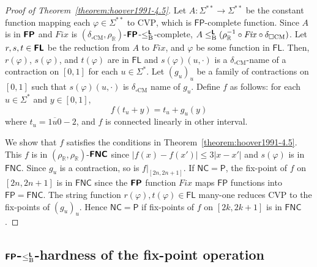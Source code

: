 \documentclass[envcountsect,envcountsame,orivec,oribibl]{llncs}
\newcommand{\R}{\mathbb R}
\newcommand{\classonefont}[1]{\mathsf{#1}}
\newcommand{\classFL}{\classonefont{FL}}
\newcommand{\classP}{\classonefont{P}}
\newcommand{\classFP}{\classonefont{FP}}
\newcommand{\classNC}{\classonefont{NC}}
\newcommand{\classFNC}{\classonefont{FNC}}
\newcommand{\classtwofont}[1]{\text{\bfseries \sffamily \upshape #1}}
\newcommand{\classLtwo}{\classtwofont{L}}
\newcommand{\classFLtwo}{\classtwofont{FL}}
\newcommand{\classFNCtwo}{\classtwofont{FNC}}
\newcommand{\classFPtwo}{\classtwofont{FP}}
\newcommand{\deltaboxCM}{\delta _{\square \mathrm{CM}}}
\newcommand{\rhoR}{\rho _\R}
\newcommand{\redB}{\leq _{\mathrm B}}
\newcommand{\redLB}{\redB ^{\classLtwo}}
\newcommand{\LM}{\varSigma ^{**}}
\newcommand{\probCVP}{\mathrm{CVP}}
\newcommand{\OpCMFix}{\mathit{Fix}}
\begin{document}
\begin{proof}[Proof of Theorem~\ref{theorem:hoover1991-4.5}]
 Let $A \colon \LM \to \LM$ be the constant function mapping each $\varphi \in \LM$ to $\probCVP$, which is $\classFP$-complete function.
 Since  $A$ is in $\classFPtwo$ and $\OpCMFix$ is $(\deltaboxCM, \rhoR)$-$\classFPtwo$-$\redLB$-complete, $A \redLB (\rhoR^{-1} \circ \OpCMFix \circ \deltaboxCM)$.
 Let $r,s,t \in \classFLtwo$ be the reduction from $A$ to $\OpCMFix$,
 and $\varphi$ be some function in $\classFL$.
 Then, $r(\varphi)$, $s(\varphi)$, and $t(\varphi)$ are in $\classFL$ and
 $s(\varphi)(u, \cdot)$ is a $\deltaboxCM$-name of a contraction on $[0,1]$ 
 for each $u \in \varSigma^*$.
 Let $(g_u)_u$ be a family of contractions on $[0,1]$
 such that $s(\varphi)(u, \cdot)$ is $\deltaboxCM$ name of $g_u$.
 Define $f$ as follows: for each $u \in \varSigma^*$ and $y \in [0, 1]$,
 \begin{equation}
  \label{eq:def-f}
 f(t_u + y) = t_u + g_u(y)
 \end{equation}
 where $t_u = \overline{1u0}-2$, 
 and $f$ is connected linearly in other interval.

 We show that $f$ satisfies the conditions in Theorem~\ref{theorem:hoover1991-4.5}.
 This $f$ is in $(\rhoR, \rhoR)$-$\classFNCtwo$ since 
 $|f(x) - f(x')| \le 3|x-x'|$ and $s(\varphi)$ is in $\classFNC$.
 Since $g_u$ is a contraction, so is $f|_{[2n, 2n+1]}$.
 If $\classNC = \classP$,
 the fix-point of $f$ on $[2n, 2n+1]$ 
 is in $\classFNC$ since the $\classFPtwo$ function 
 $\OpCMFix$ maps $\classFP$ functions into $\classFP = \classFNC$.
 The string function $r(\varphi), t(\varphi) \in \classFL$ many-one reduces
 $\probCVP$ to the fix-points of $(g_u)_u$.
 Hence $\classNC = \classP$ if fix-points of $f$ on $[2k, 2k+1]$ is in $\classFNC$.
\end{proof}

\subsection{$\classFPtwo$-$\redLB$-hardness of the fix-point operation}
\end{document}
